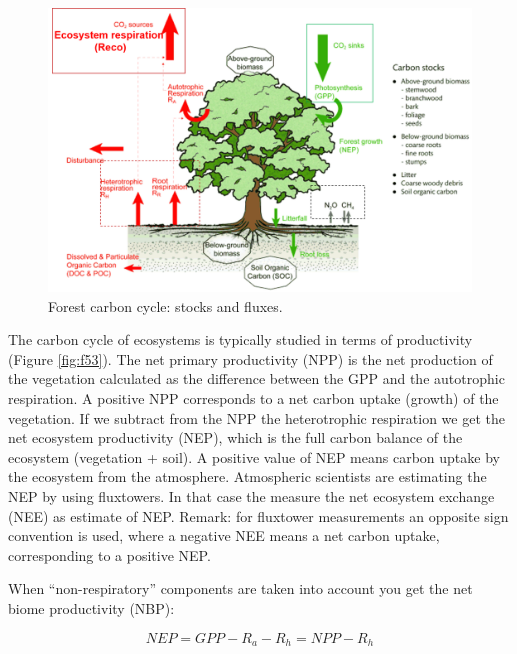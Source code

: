 \documentclass[12pt,oneside]{book}
\begin{document}
\begin{figure}

{\centering \includegraphics[width=0.8\linewidth]{figures/chap5/f52_stocks_fluxes} 

}

\caption{Forest carbon cycle: stocks and fluxes.}\label{fig:f52}
\end{figure}

The carbon cycle of ecosystems is typically studied in terms of
productivity (Figure \ref{fig:f53}). The net primary productivity (NPP)
is the net production of the vegetation calculated as the difference
between the GPP and the autotrophic respiration. A positive NPP
corresponds to a net carbon uptake (growth) of the vegetation. If we
subtract from the NPP the heterotrophic respiration we get the net
ecosystem productivity (NEP), which is the full carbon balance of the
ecosystem (vegetation + soil). A positive value of NEP means carbon
uptake by the ecosystem from the atmosphere. Atmospheric scientists are
estimating the NEP by using fluxtowers. In that case the measure the net
ecosystem exchange (NEE) as estimate of NEP. Remark: for fluxtower
measurements an opposite sign convention is used, where a negative NEE
means a net carbon uptake, corresponding to a positive NEP.

When ``non-respiratory'' components are taken into account you get the
net biome productivity (NBP):

\[ NEP = GPP - R_a - R_h = NPP - R_h \]
\end{document}
